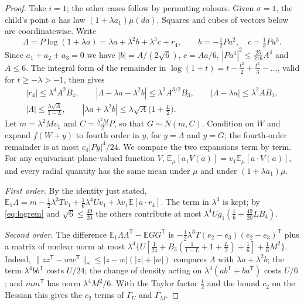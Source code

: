\documentclass[11pt]{amsart}
\theoremstyle{definition}
\theoremstyle{remark}
\newcommand{\E}{\mathbb{E}}
\begin{document}
\begin{proof}
Take $i=1$; the other cases follow by permuting colours. Given $\sigma=1$, the child's point $a$ has law
$(1+\lambda a_1)\mu(da)$. Squares and cubes of vectors below are coordinatewise. Write
\[
\Lambda=P\log(1+\lambda a)=\lambda a+\lambda^2b+\lambda^3c+r_4,\qquad b=-\tfrac12Pa^2,\quad c=\tfrac13Pa^3.
\]
Since $a_1+a_2+a_3=0$ we have $|b|=A/(2\sqrt6)$, $c=Aa/6$, $|Pa^4|^2\le\tfrac{25}{216}A^4$ and $A\le6$. The
integral form of the remainder in $\log(1+t)=t-\tfrac{t^2}2+\tfrac{t^3}3-\dots$, valid for $t\ge-\lambda>-1$, then gives
\begin{equation}\label{eq:logrem}
\begin{gathered}
|r_4|\le\lambda^4A^2B_4,\qquad|\Lambda-\lambda a-\lambda^2b|\le\lambda^3A^{3/2}B_3,\qquad|\Lambda-\lambda a|\le\lambda^2AB_1,\\
|\Lambda|\le\frac{\lambda\sqrt A}{1-L},\qquad|\lambda a+\lambda^2b|\le\lambda\sqrt A\big(1+\tfrac L2\big).
\end{gathered}
\end{equation}
Let $m=\lambda^2Mv_1$ and $C=\tfrac{\lambda^2M}2P$, so that $G\sim N(m,C)$. Condition on $W$ and expand
$f(W+y)$ to fourth order in $y$, for $y=\Lambda$ and $y=G$; the fourth-order remainder is at most
$c_4|Py|^4/24$. We compare the two expansions term by term. For any equivariant plane-valued function $V$,
$\E_\mu[a_1V(a)]=v_1\E_\mu[a\cdot V(a)]$, and every radial quantity has the same mean under $\mu$ and under
$(1+\lambda a_1)\mu$.

\emph{First order.} By the identity just stated,
$\E_1\Lambda=m-\tfrac12\lambda^3Tv_1+\tfrac16\lambda^4Uv_1+\lambda v_1\E[a\cdot r_4]$. The term in $\lambda^3$ is
kept; by \eqref{eq:logrem} and $\sqrt6\le\tfrac{49}{20}$ the others contribute at most
$\lambda^4Ug_1(\tfrac16+\tfrac{49}{20}LB_4)$.

\emph{Second order.} The difference $\E_1\Lambda\Lambda^{\mathsf T}-\E GG^{\mathsf T}$ is
$-\tfrac12\lambda^3T(e_2-e_3)(e_2-e_3)^{\mathsf T}$ plus a matrix of nuclear norm at most
$\lambda^4\{U[\tfrac1{24}+B_3(\tfrac1{1-L}+1+\tfrac L2)+\tfrac16]+\tfrac16M^2\}$. Indeed,
$\|zz^{\mathsf T}-ww^{\mathsf T}\|_*\le|z-w|(|z|+|w|)$ compares $\Lambda$ with $\lambda a+\lambda^2b$; the term
$\lambda^4bb^{\mathsf T}$ costs $U/24$; the change of density acting on $\lambda^3(ab^{\mathsf T}+ba^{\mathsf T})$ costs
$U/6$; and $mm^{\mathsf T}$ has norm $\lambda^4M^2/6$. With the Taylor factor $\tfrac12$ and the bound $c_2$ on
the Hessian this gives the $c_2$ terms of $\Gamma_U$ and $\Gamma_M$.


\end{proof}
\end{document}
